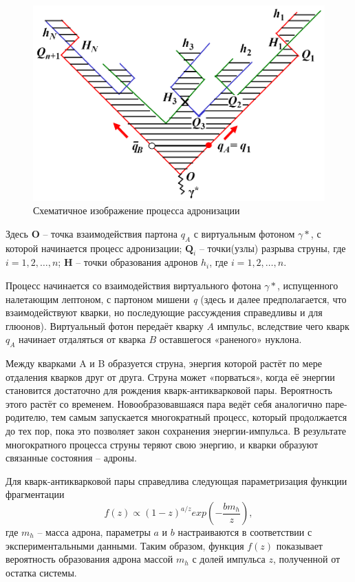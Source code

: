 \documentclass{extreport}
\begin{document}
\begin{figure}[ht]
    \centering
    \includegraphics[width = 0.8\linewidth]{fragmentation.png}
    \caption{Схематичное изображение процесса адронизации \cite{LUND}}
    \label{fig:hadronization}
\end{figure} 

Здесь \textbf{O} – точка взаимодействия партона $q_A$ с виртуальным фотоном $\gamma*$, с которой начинается процесс адронизации; $\textbf{Q}_i$ – точки(узлы) разрыва струны, где $i = 1, 2, \dots, n$; \textbf{H} -- точки образования адронов $h_i$, где $i = 1, 2, \dots, n$.

Процесс начинается со взаимодействия виртуального фотона $\gamma*$, испущенного налетающим лептоном, с партоном мишени \textit{q} (здесь и далее предполагается, что взаимодействуют кварки, но последующие рассуждения справедливы и для глюонов). Виртуальный фотон передаёт кварку $A$ импульс, вследствие чего кварк $q_A$ начинает отдаляться от кварка $B$ оставшегося «раненого» нуклона. 

Между кварками A и B образуется струна, энергия которой растёт по мере отдаления кварков друг от друга. Струна может «порваться», когда её энергии становится достаточно для рождения кварк-антикварковой пары. Вероятность этого растёт со временем. Новообразовавшаяся пара ведёт себя аналогично паре-родителю, тем самым запускается многократный процесс, который продолжается до тех пор, пока это позволяет закон сохранения энергии-импульса. В результате многократного процесса струны теряют свою энергию, и кварки образуют связанные состояния – адроны. 

Для кварк-антикварковой пары справедлива следующая параметризация функции фрагментации
\begin{equation}
	f(z) \propto (1-z)^{a/z} exp(- \frac{b m_h}{z}),
\end{equation}
где $m_h$ – масса адрона, параметры $a$ и $b$ настраиваются в соответствии с экспериментальными данными. Таким образом, функция $f(z)$ показывает вероятность образования адрона массой $m_h$ с долей импульса $z$, полученной от остатка системы.
\end{document}
